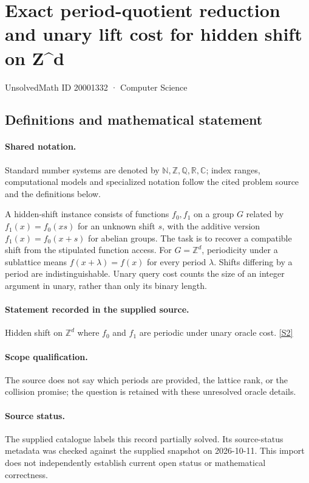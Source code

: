 \documentclass[11pt]{article}
\newcommand{\sref}[2]{\hyperlink{source:#1:#2}{[S#2]}}
\begin{document}
\setcounter{section}{20001331}
\section{Exact period-quotient reduction and unary lift cost for hidden shift on Z\textasciicircum{}d}\label{20001332}
{\small\sffamily UnsolvedMath ID 20001332 · Computer Science}
\subsection{Definitions and mathematical statement}

\paragraph{Shared notation.}Standard number systems are denoted by $\mathbb N,\mathbb Z,\mathbb Q,\mathbb R,\mathbb C$; index ranges, computational models and specialized notation follow the cited problem source and the definitions below.


A hidden-shift instance consists of functions $f_0,f_1$ on a group $G$ related by $f_1(x)=f_0(xs)$ for an unknown shift $s$, with the additive version $f_1(x)=f_0(x+s)$ for abelian groups. The task is to recover a compatible shift from the stipulated function access. For $G=\mathbb Z^d$, periodicity under a sublattice means $f(x+\lambda)=f(x)$ for every period $\lambda$. Shifts differing by a period are indistinguishable. Unary query cost counts the size of an integer argument in unary, rather than only its binary length.
\paragraph{Statement recorded in the supplied source.}
Hidden shift on $\mathbb Z^d$ where $f_0$ and $f_1$ are periodic under unary oracle cost. \sref{20001332}{2}
\paragraph{Scope qualification.}
The source does not say which periods are provided, the lattice rank, or the collision promise; the question is retained with these unresolved oracle details.
\paragraph{Source status.}
The supplied catalogue labels this record partially solved. Its source-status metadata was checked against the supplied snapshot on 2026-10-11. This import does not independently establish current open status or mathematical correctness.
\end{document}
